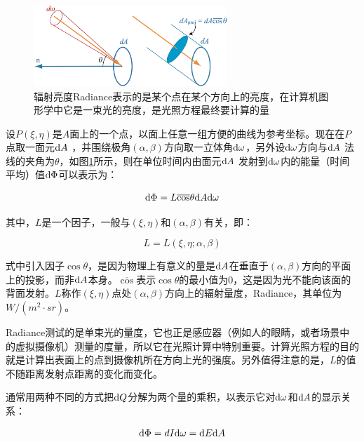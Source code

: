 \begin{figure}
\sidecaption
	\includegraphics[width=0.65\textwidth]{figures/intro/radiance}
	\caption{辐射亮度Radiance表示的是某个点在某个方向上的亮度，在计算机图形学中它是一束光的亮度，是光照方程最终要计算的量}
	\label{f:intro-radiance}
\end{figure}

设$P(\xi,\eta)$是$A$面上的一个点，以面上任意一组方便的曲线为参考坐标。现在在$P$点取一面元${\rm d}A$ ，并围绕极角$(\alpha,\beta)$方向取一立体角${\rm d}\omega$，另外设${\rm d}\omega$方向与${\rm d}A$ 法线的夹角为$\theta$，如图\ref{f:intro-radiance}所示，则在单位时间内由面元${\rm d}A$ 发射到${\rm d}\omega$内的能量（时间平均）值${\rm d}\Phi$可以表示为：

\begin{equation}\label{eq:intro-energy}
	{\rm d}\Phi=L\overline{\cos}\theta {\rm d}A {\rm d}\omega
\end{equation}

\noindent 其中，$L$是一个因子，一般与$(\xi,\eta)$和$(\alpha,\beta)$有关，即：

\begin{equation}
	L=L(\xi,\eta;\alpha,\beta)
\end{equation}

\noindent 式中引入因子$\cos\theta$，是因为物理上有意义的量是${\rm d}A$在垂直于$(\alpha,\beta)$方向的平面上的投影，而非${\rm d}A$本身。$\overline{\cos}$表示$\cos\theta$的最小值为$0$，这是因为光不能向该面的背面发射。$L$称作$(\xi,\eta)$点处$(\alpha,\beta)$方向上的辐射量度，Radiance，其单位为$W/(m^2\cdot sr)$。

Radiance测试的是单束光的量度，它也正是感应器（例如人的眼睛，或者场景中的虚拟摄像机）测量的度量，所以它在光照计算中特别重要。计算光照方程的目的就是计算出表面上的点到摄像机所在方向上光的强度。另外值得注意的是，$L$的值不随距离发射点距离的变化而变化。

通常用两种不同的方式把${\rm d}Q$分解为两个量的乘积，以表示它对${\rm d}\omega$和${\rm d} A$的显示关系：

\begin{equation}\label{eq:intro-energy-1}
	{\rm d}\Phi=dI {\rm d}\omega={\rm d}E {\rm d}A
\end{equation}

